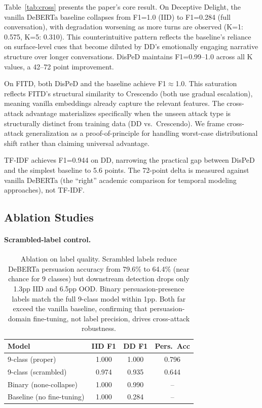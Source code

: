 \documentclass[11pt,a4paper]{article}
\newcommand{\ours}{DisPeD}
\begin{document}
Table~\ref{tab:cross} presents the paper's core result. On Deceptive Delight, the vanilla DeBERTa baseline collapses from F1=1.0 (IID) to F1=0.284 (full conversation), with degradation worsening as more turns are observed (K=1: 0.575, K=5: 0.310). This counterintuitive pattern reflects the baseline's reliance on surface-level cues that become diluted by DD's emotionally engaging narrative structure over longer conversations. \ours{} maintains F1=0.99--1.0 across all K values, a 42--72 point improvement.

On FITD, both \ours{} and the baseline achieve F1$\approx$1.0. This saturation reflects FITD's structural similarity to Crescendo (both use gradual escalation), meaning vanilla embeddings already capture the relevant features. The cross-attack advantage materializes specifically when the unseen attack type is structurally distinct from training data (DD vs.\ Crescendo). We frame cross-attack generalization as a proof-of-principle for handling worst-case distributional shift rather than claiming universal advantage.

TF-IDF achieves F1=0.944 on DD, narrowing the practical gap between \ours{} and the simplest baseline to 5.6 points. The 72-point delta is measured against vanilla DeBERTa (the ``right'' academic comparison for temporal modeling approaches), not TF-IDF.


\subsection{Ablation Studies}
\label{sec:ablations}

\paragraph{Scrambled-label control.}

\begin{table}[t]
\centering
\small
\begin{tabular}{lccc}
\toprule
\textbf{Model} & \textbf{IID F1} & \textbf{DD F1} & \textbf{Pers.\ Acc} \\
\midrule
9-class (proper) & 1.000 & 1.000 & 0.796 \\
9-class (scrambled) & 0.974 & 0.935 & 0.644 \\
Binary (none-collapse) & 1.000 & 0.990 & -- \\
Baseline (no fine-tuning) & 1.000 & 0.284 & -- \\
\bottomrule
\end{tabular}
\caption{Ablation on label quality. Scrambled labels reduce DeBERTa persuasion accuracy from 79.6\% to 64.4\% (near chance for 9 classes) but downstream detection drops only 1.3pp IID and 6.5pp OOD. Binary persuasion-presence labels match the full 9-class model within 1pp. Both far exceed the vanilla baseline, confirming that persuasion-domain fine-tuning, not label precision, drives cross-attack robustness.}
\label{tab:ablation_labels}
\end{table}
\end{document}
